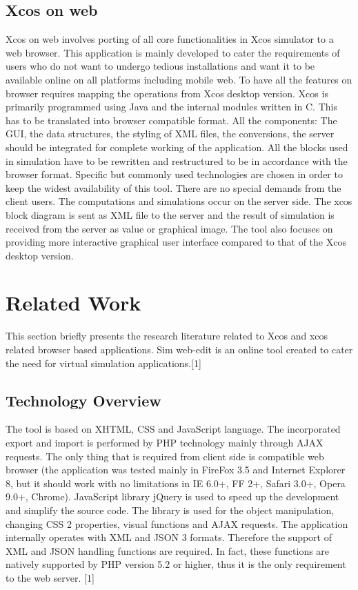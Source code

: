 \documentclass[conference]{IEEEtran}
\begin{document}
\subsection{Xcos on web}
Xcos on web involves porting of all core functionalities in Xcos simulator to a web browser. This application is mainly developed to cater the requirements of users who do not want to undergo tedious installations and want it to be available online on all platforms including mobile web. To have all the features on browser requires mapping the operations from Xcos desktop version. Xcos is primarily programmed using Java and the internal modules written in C. This has to be translated into browser compatible format. All the components: The GUI, the data structures, the styling of XML files, the conversions, the server should be integrated for complete working of the application. All the blocks used in simulation have to be rewritten and restructured to be in accordance with the browser format. Specific but commonly used technologies are chosen in order to keep the widest availability of this tool. There are no special demands from the client users. The computations and simulations occur on the server side. The xcos block diagram is sent as XML file to the server and the result of simulation is received from the server as value or graphical image. The tool also focuses on providing more interactive graphical user interface compared to that of the Xcos desktop version.

\section{Related Work}
This section briefly presents the research literature related to Xcos and xcos related browser based applications. 
Sim web-edit is an online tool created to cater the need for virtual simulation applications.[1] 

\subsection{Technology Overview}
The tool is based on XHTML, CSS and JavaScript
language. The incorporated export and import is performed
by PHP technology mainly through AJAX requests. The only thing that is required from client side is compatible web browser (the application was tested mainly in FireFox 3.5 and Internet Explorer 8, but it should work with no limitations in IE 6.0+, FF 2+, Safari 3.0+, Opera 9.0+,
Chrome). JavaScript library jQuery is used to speed up the development
and simplify the source code. The library is used for the
object manipulation, changing CSS 2 properties, visual
functions and AJAX requests. The application internally operates with XML and JSON 3 formats. Therefore the support of XML and JSON handling
functions are required. In fact, these functions are natively
supported by PHP version 5.2 or higher, thus it is the only
requirement to the web server. [1]
\end{document}
